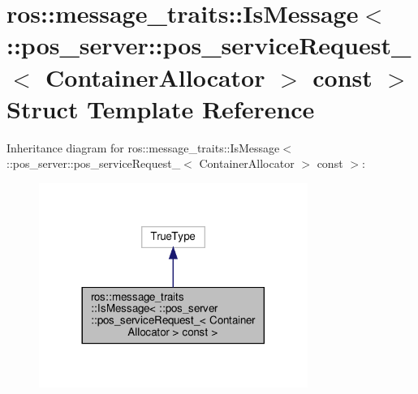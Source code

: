 \hypertarget{structros_1_1message__traits_1_1IsMessage_3_01_1_1pos__server_1_1pos__serviceRequest___3_01ContainerAllocator_01_4_01const_01_4}{}\section{ros\+:\+:message\+\_\+traits\+:\+:Is\+Message$<$ \+:\+:pos\+\_\+server\+:\+:pos\+\_\+service\+Request\+\_\+$<$ Container\+Allocator $>$ const $>$ Struct Template Reference}
\label{structros_1_1message__traits_1_1IsMessage_3_01_1_1pos__server_1_1pos__serviceRequest___3_01ContainerAllocator_01_4_01const_01_4}


Inheritance diagram for ros\+:\+:message\+\_\+traits\+:\+:Is\+Message$<$ \+:\+:pos\+\_\+server\+:\+:pos\+\_\+service\+Request\+\_\+$<$ Container\+Allocator $>$ const $>$\+:
\nopagebreak
\begin{figure}[H]
\begin{center}
\leavevmode
\includegraphics[width=248pt]{structros_1_1message__traits_1_1IsMessage_3_01_1_1pos__server_1_1pos__serviceRequest___3_01Contad3545777147b2f962b996d7ca4064bad}
\end{center}
\end{figure}


